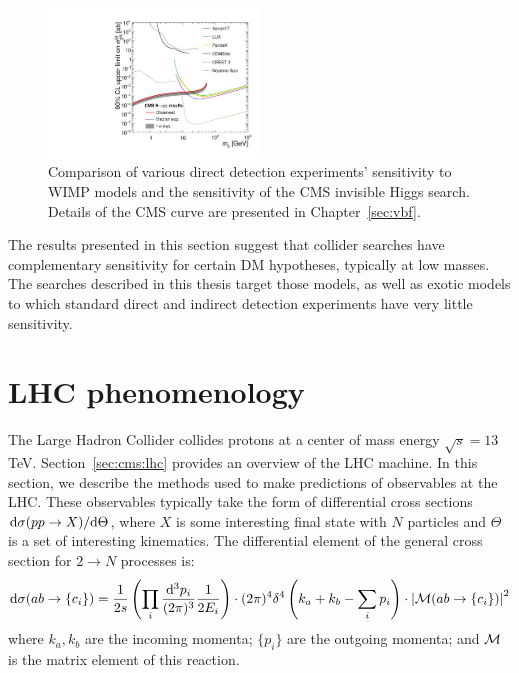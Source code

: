 \begin{figure}[]
    \begin{center}
        \includegraphics[width=0.5\textwidth]{figures/vbf/fits/dd.pdf}
        \caption{Comparison of various direct detection experiments' sensitivity to WIMP models and the sensitivity of the CMS invisible Higgs search.
                 Details of the CMS curve are presented in Chapter~\ref{sec:vbf}.}
        \label{fig:theory:lux}
    \end{center}
\end{figure}

The results presented in this section suggest that collider searches have complementary sensitivity for certain DM hypotheses, typically at low masses.
The searches described in this thesis target those models, as well as exotic models to which standard direct and indirect detection experiments have very little sensitivity.

\section{LHC phenomenology}

The Large Hadron Collider collides protons at a center of mass energy ${\sqrt{s} = 13}$ TeV.
Section~\ref{sec:cms:lhc} provides an overview of the LHC machine.
In this section, we describe the methods used to make predictions of observables at the LHC.
These observables typically take the form of differential cross sections ${\mathrm{d}\sigma(pp\rightarrow X)/\mathrm{d}\Theta}$, where ${X}$ is some interesting final state with ${N}$ particles and ${\Theta}$ is a set of interesting kinematics.
The differential element of the general cross section for ${2\rightarrow N}$ processes is:
\begin{equation}
\mathrm{d}\sigma(ab\rightarrow \{c_i\}) = 
    \frac{1}{2s} \left(\prod_i \dfrac{\mathrm{d}^3p_i}{(2\pi)^3} \frac{1}{2E_i}\right) 
        \cdot (2\pi)^4 \delta^4\left(k_a + k_b - \sum_i p_i\right) 
        \cdot \left|\mathcal{M}(ab\rightarrow \{c_i\})\right|^2
        \label{eq:theory:2n}
\end{equation}
where ${k_a,k_b}$ are the incoming momenta; ${\{p_i\}}$ are the outgoing momenta; and ${\mathcal{M}}$ is the matrix element of this reaction.

